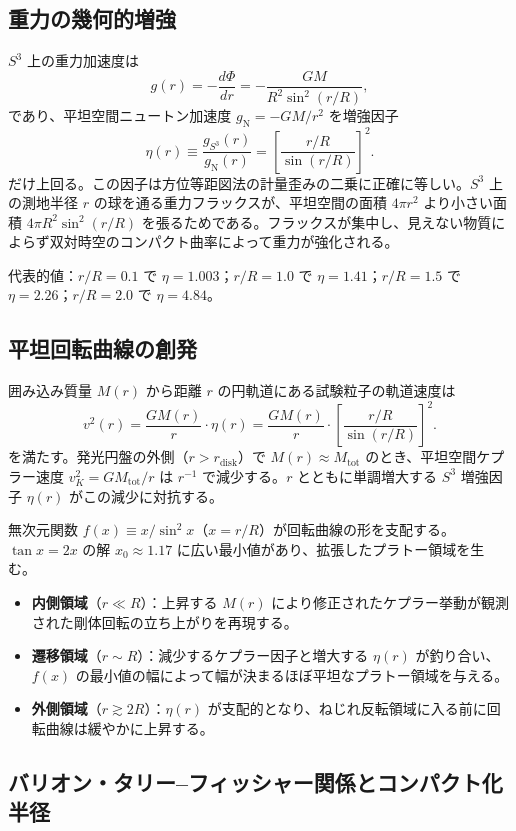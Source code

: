 \documentclass[dvipdfmx,a4paper]{article}
\begin{document}
\subsection{重力の幾何的増強}

$S^3$ 上の重力加速度は
\[
g(r) = -\frac{d\Phi}{dr} = -\frac{GM}{R^2 \sin^2(r/R)},
\]
であり、平坦空間ニュートン加速度 $g_{\text{N}} = -GM/r^2$ を増強因子
\[
\eta(r) \equiv \frac{g_{S^3}(r)}{g_{\text{N}}(r)} = \left[\frac{r/R}{\sin(r/R)}\right]^2.
\]
だけ上回る。この因子は方位等距図法の計量歪みの二乗に正確に等しい。$S^3$ 上の測地半径 $r$ の球を通る重力フラックスが、平坦空間の面積 $4\pi r^2$ より小さい面積 $4\pi R^2 \sin^2(r/R)$ を張るためである。フラックスが集中し、見えない物質によらず双対時空のコンパクト曲率によって重力が強化される。

代表的値：$r/R = 0.1$ で $\eta = 1.003$；$r/R = 1.0$ で $\eta = 1.41$；$r/R = 1.5$ で $\eta = 2.26$；$r/R = 2.0$ で $\eta = 4.84$。

\subsection{平坦回転曲線の創発}

囲み込み質量 $M(r)$ から距離 $r$ の円軌道にある試験粒子の軌道速度は
\[
v^2(r) = \frac{GM(r)}{r} \cdot \eta(r) = \frac{GM(r)}{r} \cdot \left[\frac{r/R}{\sin(r/R)}\right]^2.
\]
を満たす。発光円盤の外側（$r > r_{\text{disk}}$）で $M(r) \approx M_{\text{tot}}$ のとき、平坦空間ケプラー速度 $v_K^2 = GM_{\text{tot}}/r$ は $r^{-1}$ で減少する。$r$ とともに単調増大する $S^3$ 増強因子 $\eta(r)$ がこの減少に対抗する。

無次元関数 $f(x) \equiv x / \sin^2 x$（$x = r/R$）が回転曲線の形を支配する。$\tan x = 2x$ の解 $x_0 \approx 1.17$ に広い最小値があり、拡張したプラトー領域を生む。
\begin{itemize}
  \item \textbf{内側領域}（$r \ll R$）：上昇する $M(r)$ により修正されたケプラー挙動が観測された剛体回転の立ち上がりを再現する。
  \item \textbf{遷移領域}（$r \sim R$）：減少するケプラー因子と増大する $\eta(r)$ が釣り合い、$f(x)$ の最小値の幅によって幅が決まるほぼ平坦なプラトー領域を与える。
  \item \textbf{外側領域}（$r \gtrsim 2R$）：$\eta(r)$ が支配的となり、ねじれ反転領域に入る前に回転曲線は緩やかに上昇する。
\end{itemize}

\subsection{バリオン・タリー--フィッシャー関係とコンパクト化半径}
\end{document}
